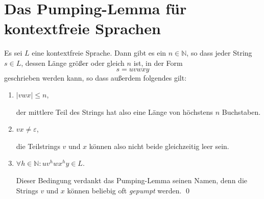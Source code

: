\section{Das Pumping-Lemma f\"ur kontextfreie Sprachen}
\begin{Satz}
Es sei $L$ eine kontextfreie Sprache.  Dann gibt es ein $n \in \mathbb{N}$, so dass jeder String
$s \in L$, dessen L\"ange gr\"o{\ss}er oder gleich $n$ ist, in der Form 
\[ s = uvwxy \]
geschrieben werden kann, so dass au{\ss}erdem folgendes gilt:
\begin{enumerate}
\item $|vwx| \leq n$,

      der mittlere Teil des Strings hat also eine L\"ange von h\"ochstens $n$ Buchstaben.
\item $vx \not= \varepsilon$,

      die Teilstrings $v$ und $x$ k\"onnen also nicht beide gleichzeitig leer sein.
\item $\forall h \in \mathbb{N}: uv^hwx^hy \in L$.

      Dieser Bedingung  verdankt das Pumping-Lemma seinen Namen, denn die Strings $v$ und $x$ k\"onnen
      beliebig oft \emph{gepumpt} werden. \qed
\end{enumerate}
\end{Satz}

